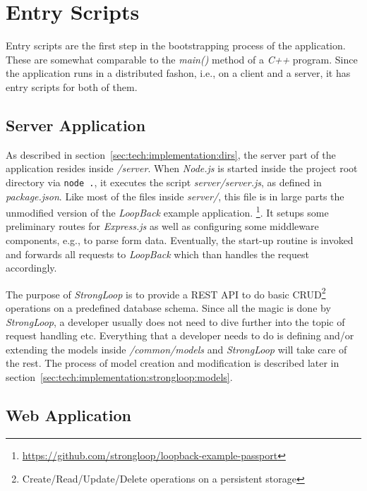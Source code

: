 \documentclass[nochapterpage,nopartpage,noheadingspace,numbersubsubsec,bigchapter,colorback,accentcolor=tud9c,10pt]{tudreport}
\begin{document}
  \section{Entry Scripts}
  \label{sec:tech:implementation:bootstrapping}

    Entry scripts are the first step in the bootstrapping process of the application. These are somewhat comparable to the \emph{main()} method of a \emph{C++} program. Since the application runs in a distributed fashon, i.e., on a client and a server, it has entry scripts for both of them.

  \subsection{Server Application}
  \label{sec:tech:implementation:bootstrapping:server}

    As described in section~\ref{sec:tech:implementation:dirs}, the server part of the application resides inside \emph{/server}. When \emph{Node.js} is started inside the project root directory via \texttt{node .}, it executes the script \emph{server/server.js}, as defined in \emph{package.json}. Like most of the files inside \emph{server/}, this file is in large parts the unmodified version of the \emph{LoopBack} example application.%
    \footnote{\url{https://github.com/strongloop/loopback-example-passport}}. It setups some preliminary routes for \emph{Express.js} as well as configuring some middleware components, e.g., to parse form data. Eventually, the start-up routine is invoked and forwards all requests to \emph{LoopBack} which than handles the request accordingly.

    The purpose of \emph{StrongLoop} is to provide a REST API to do basic CRUD\footnote{Create/Read/Update/Delete operations on a persistent storage} operations on a predefined database schema. Since all the magic is done by \emph{StrongLoop}, a developer usually does not need to dive further into the topic of request handling etc. Everything that a developer needs to do is defining and/or extending the models inside \emph{/common/models} and \emph{StrongLoop} will take care of the rest. The process of model creation and modification is described later in section~\ref{sec:tech:implementation:strongloop:models}.

  \subsection{Web Application}
  \label{sec:tech:implementation:bootstrapping:web}
\end{document}

